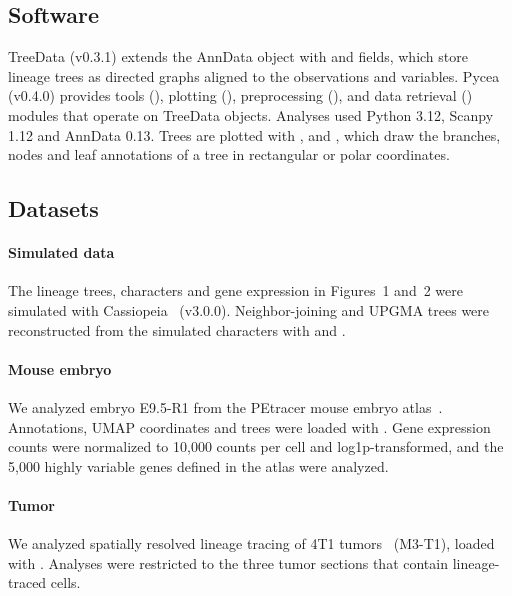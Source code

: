 \subsection*{Software}
TreeData (v0.3.1) extends the AnnData object with  and  fields, which store lineage trees as  directed graphs \citep{hagberg2008networkx} aligned to the observations and variables. Pycea (v0.4.0) provides tools (), plotting (), preprocessing (), and data retrieval () modules that operate on TreeData objects. Analyses used Python 3.12, Scanpy~\cite{wolf2018scanpy} 1.12 and AnnData 0.13. Trees are plotted with ,  and , which draw the branches, nodes and leaf annotations of a tree in rectangular or polar coordinates.

\subsection*{Datasets}
\paragraph{Simulated data}
The lineage trees, characters and gene expression in Figures~1 and~2 were simulated with Cassiopeia~\cite{jones2020cassiopeia} (v3.0.0). Neighbor-joining and UPGMA trees were reconstructed from the simulated characters with  and .

\paragraph{Mouse embryo} We analyzed embryo E9.5-R1 from the PEtracer mouse embryo atlas~\cite{colgan2026}. Annotations, UMAP coordinates and trees were loaded with . Gene expression counts were normalized to 10,000 counts per cell and log1p-transformed, and the 5,000 highly variable genes defined in the atlas were analyzed.

\paragraph{Tumor} We analyzed spatially resolved lineage tracing of 4T1 tumors~\cite{koblan2025} (M3-T1), loaded with . Analyses were restricted to the three tumor sections that contain lineage-traced cells.

